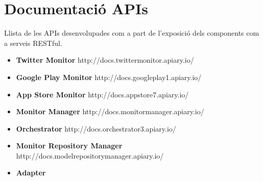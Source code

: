 
\chapter{Documentació APIs} %

\label{APIs} %

Llista de les APIs desenvolupades com a part de l'exposició dels components com a serveis RESTful.\\

\begin{itemize}
\item \textbf{Twitter Monitor}
\subitem http://docs.twittermonitor.apiary.io/
\item \textbf{Google Play Monitor}
\subitem http://docs.googleplay1.apiary.io/
\item \textbf{App Store Monitor}
\subitem http://docs.appstore7.apiary.io/
\item \textbf{Monitor Manager}
\subitem http://docs.monitormanager.apiary.io/
\item \textbf{Orchestrator}
\subitem http://docs.orchestrator3.apiary.io/
\item \textbf{Monitor Repository Manager}
http://docs.modelrepositorymanager.apiary.io/
\item \textbf{Adapter}

\end{itemize}